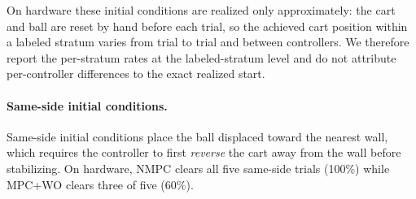 On hardware these initial conditions are realized only approximately: the
cart and ball are reset by hand before each trial, so the achieved cart
position within a labeled stratum varies from trial to trial and between
controllers. We therefore report the per-stratum rates at the
labeled-stratum level and do not attribute per-controller differences to
the exact realized start.

\paragraph{Same-side initial conditions.}
Same-side initial conditions place the ball displaced toward the nearest
wall, which requires the controller to first \emph{reverse} the cart away
from the wall before stabilizing. On hardware, NMPC clears all five
same-side trials (100\%) while MPC+WO clears three of five (60\%).

